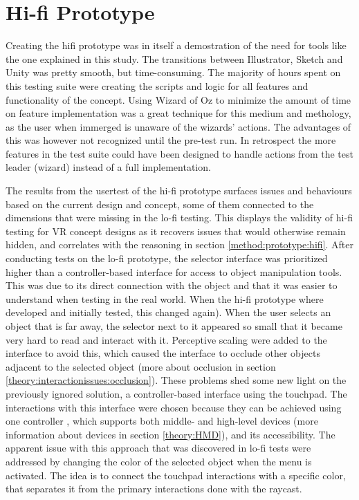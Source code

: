 \section{Hi-fi Prototype}
Creating the hifi prototype was in itself a demostration of the need for tools like the one explained in this study. The transitions between Illustrator, Sketch and Unity was pretty smooth, but time-consuming. The majority of hours spent on this testing suite were creating the scripts and logic for all features and functionality of the concept. Using Wizard of Oz to minimize the amount of time on feature implementation was a great technique for this medium and methology, as the user when immerged is unaware of the wizards' actions. The advantages of this was however not recognized until the pre-test run. In retrospect the more features in the test suite could have been designed to handle actions from the test leader (wizard) instead of a full implementation.

The results from the usertest of the hi-fi prototype surfaces issues and behaviours based on the current design and concept, some of them connected to the dimensions that were missing in the lo-fi testing. This displays the validity of hi-fi testing for VR concept designs as it recovers issues that would otherwise remain hidden, and correlates with the reasoning in section \ref{method:prototype:hifi}. After conducting tests on the lo-fi prototype, the selector interface was prioritized higher than a controller-based interface for access to object manipulation tools. This was due to its direct connection with the object and that it was easier to understand when testing in the real world. When the hi-fi prototype where developed and initially tested, this changed again). When the user selects an object that is far away, the selector next to it appeared so small that it became very hard to read and interact with it. Perceptive scaling were added to the interface to avoid this, which caused the interface to occlude other objects adjacent to the selected object (more about occlusion in section \ref{theory:interactionissues:occlusion}). These problems shed some new light on the previously ignored solution, a controller-based interface using the touchpad. The interactions with this interface were chosen because they can be achieved using one controller , which supports both middle- and high-level devices (more information about devices in section \ref{theory:HMD}), and its accessibility. The apparent issue with this approach that was discovered in lo-fi tests were addressed by changing the color of the selected object when the menu is activated. The idea is to connect the touchpad interactions with a specific color, that separates it from the primary interactions done with the raycast.

